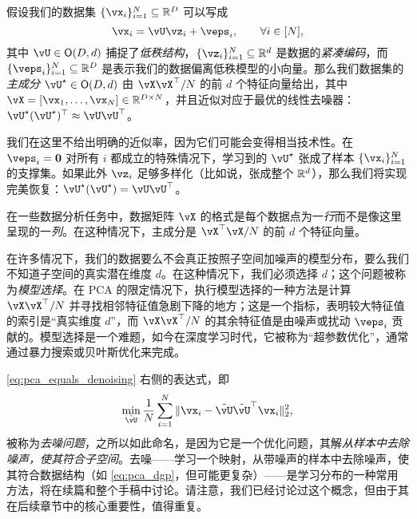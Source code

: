 \documentclass[../../book-main.tex]{subfiles}
\begin{document}
\begin{theorem}\label{thm:pca}
    假设我们的数据集 \(\{\vx_{i}\}_{i = 1}^{N} \subseteq \R^{D}\) 可以写成
    \begin{equation}
        \vx_{i} = \vU\vz_{i} + \veps_{i}, \qquad \forall i \in [N],
    \end{equation}
    其中 \(\vU \in \O(D, d)\) 捕捉了\textit{低秩结构}，\(\{\vz_{i}\}_{i = 1}^{N} \subseteq \R^{d}\) 是数据的\textit{紧凑编码}，而 \(\{\veps_{i}\}_{i = 1}^{N} \subseteq \R^{D}\) 是表示我们的数据偏离低秩模型的小向量。那么我们数据集的\textit{主成分} \(\vU^{\star} \in \O(D, d)\) 由 \(\vX\vX^{\top}/N\) 的前 \(d\) 个特征向量给出，其中 \(\vX = [\vx_{1}, \dots, \vx_{N}] \in \R^{D \times N}\)，并且近似对应于最优的线性去噪器：\(\vU^{\star}(\vU^{\star})^{\top} \approx \vU\vU^{\top}\)。
\end{theorem}
我们在这里不给出明确的近似率，因为它们可能会变得相当技术性。在 \(\veps_{i} = \vzero\) 对所有 \(i\) 都成立的特殊情况下，学习到的 \(\vU^{\star}\) 张成了样本 \(\{\vx_{i}\}_{i = 1}^{N}\) 的支撑集。如果此外 \(\vz_{i}\) 足够多样化（比如说，张成整个 \(\mathbb{R}^{d}\)），那么我们将实现完美恢复：\(\vU^{\star}(\vU^{\star}) = \vU\vU^{\top}\)。


\begin{remark}
    在一些数据分析任务中，数据矩阵 \(\vX\) 的格式是每个数据点为一\textit{行}而不是像这里呈现的一\textit{列}。在这种情况下，主成分是 \(\vX^{\top}\vX/N\) 的前 \(d\) 个特征向量。
\end{remark}


\begin{remark}[通过去噪特征值选择基]
    在许多情况下，我们的数据要么不会真正按照子空间加噪声的模型分布，要么我们不知道子空间的真实潜在维度 \(d\)。在这种情况下，我们必须选择 \(d\)；这个问题被称为\textit{模型选择}。在 PCA 的限定情况下，执行模型选择的一种方法是计算 \(\vX\vX^{\top}/N\) 并寻找相邻特征值急剧下降的地方；这是一个指标，表明较大特征值的索引是“真实维度 \(d\)”，而 \(\vX\vX^{\top}/N\) 的其余特征值是由噪声或扰动 \(\veps_{i}\) 贡献的。模型选择是一个难题，如今在深度学习时代，它被称为“超参数优化”，通常通过暴力搜索或贝叶斯优化来完成。%
\end{remark}

\begin{remark}[去噪样本]
    \eqref{eq:pca_equals_denoising} 右侧的表达式，即
    \begin{equation}\label{eq:orthogonal_denoising}
        \min_{\tilde{\vU}}\frac{1}{N}\sum_{i = 1}^{N}\norm{\vx_{i} - \tilde{\vU}\tilde{\vU}^{\top}\vx_{i}}_{2}^{2},
    \end{equation}
    被称为\textit{去噪问题}，之所以如此命名，是因为它是一个优化问题，其解\textit{从样本中去除噪声，使其符合子空间}。去噪——学习一个映射，从带噪声的样本中去除噪声，使其符合数据结构（如 \eqref{eq:pca_dgp}，但可能更复杂）——是学习分布的一种常用方法，将在续篇和整个手稿中讨论。请注意，我们已经讨论过这个概念，但由于其在后续章节中的核心重要性，值得重复。
\end{remark}
\end{document}
